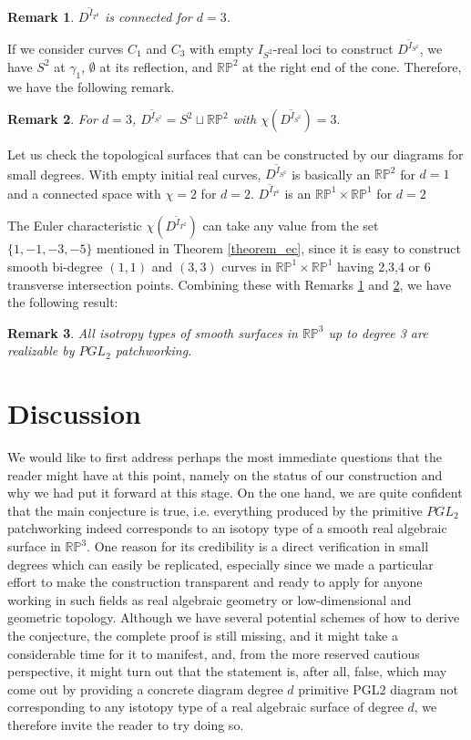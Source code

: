 \documentclass[pdflatex,sn-mathphys-num]{sn-jnl}%
\theoremstyle{thmstyleone}%
\theoremstyle{thmstyletwo}%
\newtheorem{remark}{Remark}%
\theoremstyle{thmstylethree}%
\newcommand{\RP}{\mathbb{R}\mathbb{P}}
\begin{document}
\begin{remark}\label{remark_connectT^2}
$\overline{D^{I_{T^2}}}$ is connected for $d=3$.
\end{remark}
If we consider curves $C_1$ and $C_3$ with empty $I_{S^2}$-real loci to construct $\overline{D^{I_{S^2}}}$, we have $S^2$ at $\gamma_1$, $\emptyset$ at its reflection, and $\RP^2$ at the right end of the cone. Therefore, we have the following remark.
\begin{remark}\label{remark_ec}
 For $d=3$,   $\overline{D^{I_{S^2}}}=S^2\sqcup\RP^2$ with $\chi(\overline{D^{I_{S^2}}})=3.$
\end{remark}
Let us check the topological surfaces that can be constructed by our diagrams for small degrees. With empty initial real curves, $\overline{D^{I_{S^2}}}$  is basically  an $\RP^2$ for $d=1$ and a connected space with $\chi=2$ for $d=2$. $\overline{D^{I_{T^2}}}$ is an $\RP^1\times\RP^1$ for $d=2$ 


The Euler characteristic $\chi(\overline{D^{I_{T^2}}})$ can take any value from the set $\{1,-1,-3,-5\}$ mentioned in Theorem \ref{theorem_ec}, since it is easy to construct smooth bi-degree $(1,1)$ and $(3,3)$ curves in $\RP^1\times \RP^1$ having 2,3,4 or 6 transverse intersection points. Combining these with Remarks \ref{remark_connectT^2} and \ref{remark_ec}, we have the following result:
\begin{remark}
All isotropy types of smooth surfaces in $\RP^3$ up to degree 3 are realizable by $PGL_2$ patchworking. \end{remark}


\section{Discussion}
We would like to first address perhaps the most immediate questions that the reader might have at this point, namely on the status of our construction and why we had put it forward at this stage. On the one hand, we are quite confident that the main
conjecture is true, i.e. everything produced by the primitive $PGL_2$ patchworking  indeed corresponds to an isotopy type of a smooth real algebraic surface in $\RP^3$. One reason for its credibility is a direct verification in small degrees which can easily be replicated, especially since we made a particular effort to make the construction transparent and ready to apply for anyone working in such fields as real algebraic geometry or low-dimensional and geometric topology. Although we have several potential schemes of how to derive the conjecture, the
complete proof is still missing, and it might take a considerable time
for it to manifest, and, from the more reserved cautious perspective, it might
turn out that the statement is, after all, false, which may come out by providing
a concrete diagram degree $d$ primitive PGL2 diagram not corresponding to any istotopy type of a real algebraic surface of degree $d$, we therefore invite the reader to try doing so.
\end{document}
